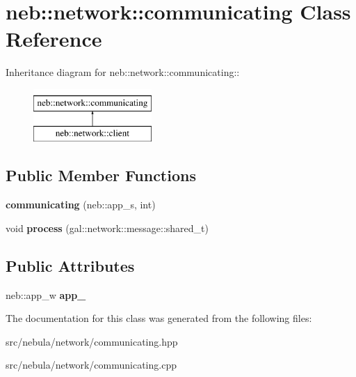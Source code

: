 \hypertarget{classneb_1_1network_1_1communicating}{
\section{neb::network::communicating Class Reference}
\label{classneb_1_1network_1_1communicating}
}
Inheritance diagram for neb::network::communicating::\begin{figure}[H]
\begin{center}
\leavevmode
\includegraphics[height=2cm]{classneb_1_1network_1_1communicating}
\end{center}
\end{figure}
\subsection*{Public Member Functions}
\begin{DoxyCompactItemize}
\item 
\hypertarget{classneb_1_1network_1_1communicating_aa56d7ee8b8546ecc25b2cc63603184e9}{
{\bfseries communicating} (neb::app\_\-s, int)}
\label{classneb_1_1network_1_1communicating_aa56d7ee8b8546ecc25b2cc63603184e9}

\item 
\hypertarget{classneb_1_1network_1_1communicating_a98c549330850584cd5ec57028785b777}{
void {\bfseries process} (gal::network::message::shared\_\-t)}
\label{classneb_1_1network_1_1communicating_a98c549330850584cd5ec57028785b777}

\end{DoxyCompactItemize}
\subsection*{Public Attributes}
\begin{DoxyCompactItemize}
\item 
\hypertarget{classneb_1_1network_1_1communicating_a9bac744763987c357b07a070ce2f1215}{
neb::app\_\-w {\bfseries app\_\-}}
\label{classneb_1_1network_1_1communicating_a9bac744763987c357b07a070ce2f1215}

\end{DoxyCompactItemize}


The documentation for this class was generated from the following files:\begin{DoxyCompactItemize}
\item 
src/nebula/network/communicating.hpp\item 
src/nebula/network/communicating.cpp\end{DoxyCompactItemize}

